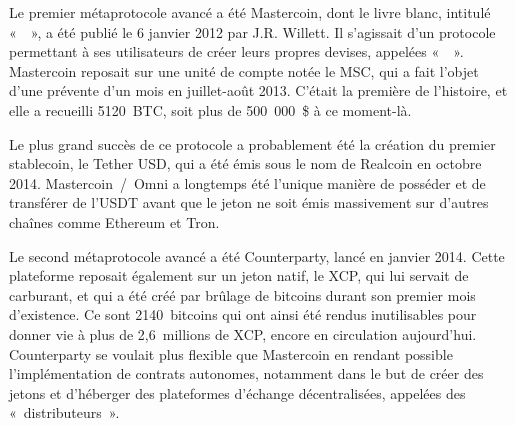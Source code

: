 Le premier métaprotocole avancé a été Mastercoin, dont le livre blanc, intitulé «~~», a été publié le 6 janvier 2012 par J.R. Willett. Il s'agissait d'un protocole permettant à ses utilisateurs de créer leurs propres devises, appelées «~~». Mastercoin reposait sur une unité de compte notée le MSC, qui a fait l'objet d'une prévente d'un mois en juillet-août 2013. C'était la première  de l'histoire, et elle a recueilli 5120~BTC, soit plus de 500~000~\$ à ce moment-là.

Le plus grand succès de ce protocole a probablement été la création du premier stablecoin, le Tether USD, qui a été émis sous le nom de Realcoin en octobre 2014. Mastercoin~/~Omni a longtemps été l'unique manière de posséder et de transférer de l'USDT avant que le jeton ne soit émis massivement sur d'autres chaînes comme Ethereum et Tron.

Le second métaprotocole avancé a été Counterparty, lancé en janvier 2014. Cette plateforme reposait également sur un jeton natif, le XCP, qui lui servait de carburant, et qui a été créé par brûlage de bitcoins durant son premier mois d'existence. Ce sont 2140~bitcoins qui ont ainsi été rendus inutilisables pour donner vie à plus de 2,6~millions de XCP, encore en circulation aujourd'hui. Counterparty se voulait plus flexible que Mastercoin en rendant possible l'implémentation de contrats autonomes, notamment dans le but de créer des jetons et d'héberger des plateformes d'échange décentralisées, appelées des «~distributeurs~».

